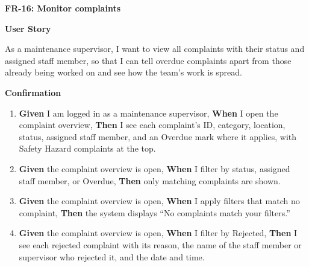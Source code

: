\noindent\textbf{FR-16: Monitor complaints}\par\nopagebreak[4]\smallskip
\noindent\textbf{User Story}\par\nopagebreak[4]
\noindent As a maintenance supervisor, I want to view all complaints with their status and assigned staff member, so that I can tell overdue complaints apart from those already being worked on and see how the team's work is spread.\par\smallskip
{\makeatletter
{}
\makeatother
\noindent\textbf{Confirmation}\par\nopagebreak[4]\vspace{-6pt}\nopagebreak[4]
\begin{enumerate}\setlength{\itemsep}{2pt}\setlength{\parsep}{0pt}\setlength{\topsep}{2pt}\setlength{\partopsep}{0pt}
  \item \textbf{Given} I am logged in as a maintenance supervisor, \textbf{When} I open the complaint overview, \textbf{Then} I see each complaint's ID, category, location, status, assigned staff member, and an Overdue mark where it applies, with Safety Hazard complaints at the top.
  \item \textbf{Given} the complaint overview is open, \textbf{When} I filter by status, assigned staff member, or Overdue, \textbf{Then} only matching complaints are shown.
  \item \textbf{Given} the complaint overview is open, \textbf{When} I apply filters that match no complaint, \textbf{Then} the system displays ``No complaints match your filters.''
  \item \textbf{Given} the complaint overview is open, \textbf{When} I filter by Rejected, \textbf{Then} I see each rejected complaint with its reason, the name of the staff member or supervisor who rejected it, and the date and time.
\end{enumerate}}
\medskip
 
